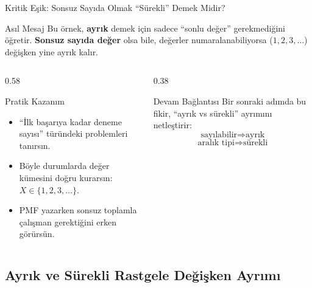 \documentclass[light]{lutbeamer}
\begin{document}
\begin{frame}{Kritik Eşik: Sonsuz Sayıda Olmak ``Sürekli'' Demek Midir?}
\small
\begin{block}{Asıl Mesaj}
Bu örnek, \textbf{ayrık} demek için sadece ``sonlu değer'' gerekmediğini öğretir.
\textbf{Sonsuz sayıda değer} olsa bile, değerler numaralanabiliyorsa (\(1,2,3,\dots\)) değişken yine ayrık kalır.
\end{block}

\begin{columns}[T]
  \begin{column}{0.58\textwidth}
    \begin{alertblock}{Pratik Kazanım}
      \begin{itemize}
        \item ``İlk başarıya kadar deneme sayısı'' türündeki problemleri tanırsın.
        \item Böyle durumlarda değer kümesini doğru kurarsın: \(X\in\{1,2,3,\dots\}\).
        \item PMF yazarken sonsuz toplamla çalışman gerektiğini erken görürsün.
      \end{itemize}
    \end{alertblock}
  \end{column}
  \begin{column}{0.38\textwidth}
    \begin{block}{Devam Bağlantısı}
      Bir sonraki adımda bu fikir, ``ayrık vs sürekli'' ayrımını netleştirir:
      \[
      \text{sayılabilir} \Rightarrow \text{ayrık}
      \]
      \[
      \text{aralık tipi} \Rightarrow \text{sürekli}
      \]
    \end{block}
  \end{column}
\end{columns}
\end{frame}
\subsection{Ayrık ve Sürekli Rastgele Değişken Ayrımı}
\end{document}
